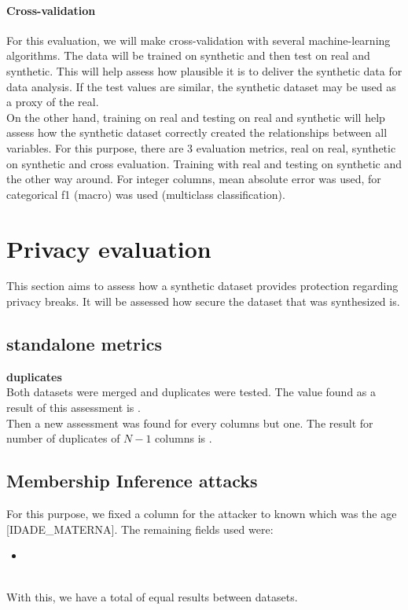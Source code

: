 \documentclass{article}
\begin{document}
\paragraph{Cross-validation}
For this evaluation, we will make cross-validation with several machine-learning algorithms.
The data will be trained on synthetic and then test on real and synthetic. This will help assess how plausible it is to deliver the synthetic data for data analysis. If the test values are similar, the synthetic dataset may be used as a proxy of the real.\\
On the other hand, training on real and testing on real and synthetic will help assess how the synthetic dataset correctly created the relationships between all variables.
For this purpose, there are 3 evaluation metrics, real on real, synthetic on synthetic and cross evaluation. Training with real and testing on synthetic and the other way around. For integer columns, mean absolute error was used, for categorical f1 (macro) was used (multiclass classification).\\





\section{Privacy evaluation}
This section aims to assess how a synthetic dataset provides protection regarding privacy breaks. It will be assessed how secure the dataset that was synthesized is.
\subsection{standalone metrics}
\textbf{duplicates}\\

Both datasets were merged and duplicates were tested. The value found as a result of this assessment is .\\
Then a new assessment was found for every columns but one. The result for number of duplicates of $N-1$ columns is . 

\subsection{Membership Inference attacks}
For this purpose, we fixed a column for the attacker to known which was the age [IDADE\_MATERNA].
The remaining fields used were:
\begin{itemize}
  \item {}
  \end{itemize}
\\
With this, we have a total of  equal results between datasets.
\end{document}
